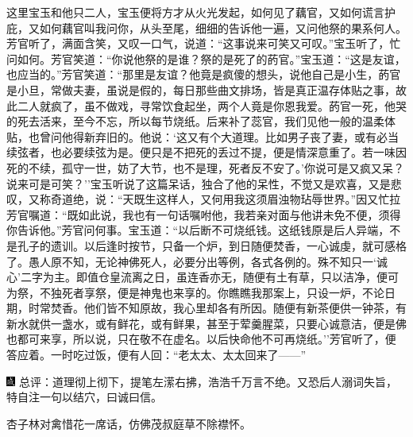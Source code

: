 这里宝玉和他只二人，宝玉便将方才从火光发起，如何见了藕官，又如何谎言护庇，又如何藕官叫我问你，从头至尾，细细的告诉他一遍，又问他祭的果系何人。芳官听了，满面含笑，又叹一口气，说道：``这事说来可笑又可叹。''宝玉听了，忙问如何。芳官笑道：``你说他祭的是谁？祭的是死了的菂官。''宝玉道：``这是友谊，也应当的。''芳官笑道：``那里是友谊？他竟是疯傻的想头，说他自己是小生，菂官是小旦，常做夫妻，虽说是假的，每日那些曲文排场，皆是真正温存体贴之事，故此二人就疯了，虽不做戏，寻常饮食起坐，两个人竟是你恩我爱。菂官一死，他哭的死去活来，至今不忘，所以每节烧纸。后来补了蕊官，我们见他一般的温柔体贴，也曾问他得新弃旧的。他说：`这又有个大道理。比如男子丧了妻，或有必当续弦者，也必要续弦为是。便只是不把死的丢过不提，便是情深意重了。若一味因死的不续，孤守一世，妨了大节，也不是理，死者反不安了。'你说可是又疯又呆？说来可是可笑？''宝玉听说了这篇呆话，独合了他的呆性，不觉又是欢喜，又是悲叹，又称奇道绝，说：``天既生这样人，又何用我这须眉浊物玷辱世界。''因又忙拉芳官嘱道：``既如此说，我也有一句话嘱咐他，我若亲对面与他讲未免不便，须得你告诉他。''芳官问何事。宝玉道：``以后断不可烧纸钱。这纸钱原是后人异端，不是孔子的遗训。以后逢时按节，只备一个炉，到日随便焚香，一心诚虔，就可感格了。愚人原不知，无论神佛死人，必要分出等例，各式各例的。殊不知只一`诚心'二字为主。即值仓皇流离之日，虽连香亦无，随便有土有草，只以洁净，便可为祭，不独死者享祭，便是神鬼也来享的。你瞧瞧我那案上，只设一炉，不论日期，时常焚香。他们皆不知原故，我心里却各有所因。随便有新茶便供一钟茶，有新水就供一盏水，或有鲜花，或有鲜果，甚至于荤羹腥菜，只要心诚意洁，便是佛也都可来享，所以说，只在敬不在虚名。以后快命他不可再烧纸。''芳官听了，便答应着。一时吃过饭，便有人回：``老太太、太太回来了------''

{\includegraphics[width=3mm]{../Images/00005}  \kaishu 总评：道理彻上彻下，提笔左潆右拂，浩浩千万言不绝。又恐后人溺词失旨，特自注一句以结穴，曰诚曰信。}

{杏子林对禽惜花一席话，仿佛茂叔庭草不除襟怀。}

